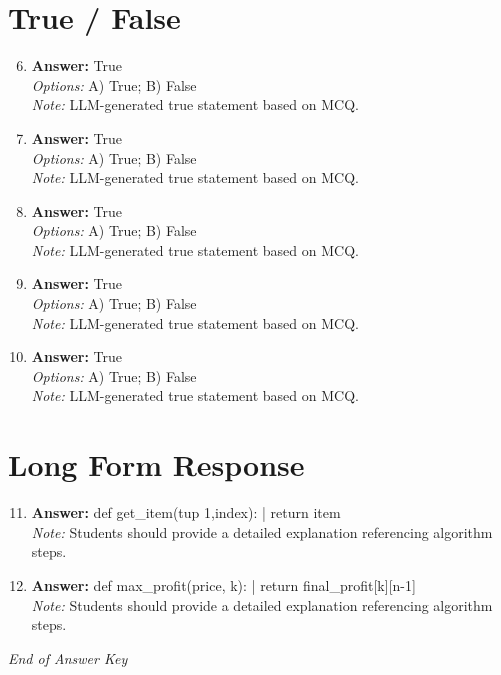 \documentclass[12pt]{article}
\begin{document}
\section*{True / False}
\begin{enumerate}[label=\arabic*.]
\setcounter{enumi}{5}
\item \textbf{Answer:} True
\\ \textit{Options:} A) True; B) False
\\ \textit{Note:} LLM-generated true statement based on MCQ.
\item \textbf{Answer:} True
\\ \textit{Options:} A) True; B) False
\\ \textit{Note:} LLM-generated true statement based on MCQ.
\item \textbf{Answer:} True
\\ \textit{Options:} A) True; B) False
\\ \textit{Note:} LLM-generated true statement based on MCQ.
\item \textbf{Answer:} True
\\ \textit{Options:} A) True; B) False
\\ \textit{Note:} LLM-generated true statement based on MCQ.
\item \textbf{Answer:} True
\\ \textit{Options:} A) True; B) False
\\ \textit{Note:} LLM-generated true statement based on MCQ.
\end{enumerate}

\section*{Long Form Response}
\begin{enumerate}[label=\arabic*.]
\setcounter{enumi}{10}
\item \textbf{Answer:} def get\_item(tup 1,index): | return item
\\ \textit{Note:} Students should provide a detailed explanation referencing algorithm steps.
\item \textbf{Answer:} def max\_profit(price, k): | return final\_profit[k][n-1]
\\ \textit{Note:} Students should provide a detailed explanation referencing algorithm steps.
\end{enumerate}

\vfill
\noindent\textit{End of Answer Key}
\end{document}
